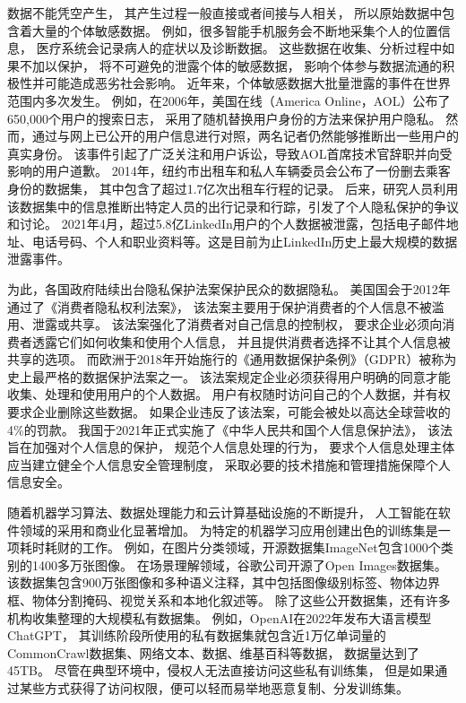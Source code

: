 数据不能凭空产生，
其产生过程一般直接或者间接与人相关，
所以原始数据中包含着大量的个体敏感数据。
例如，很多智能手机服务会不断地采集个人的位置信息，
医疗系统会记录病人的症状以及诊断数据。
这些数据在收集、分析过程中如果不加以保护，
将不可避免的泄露个体的敏感数据，
影响个体参与数据流通的积极性并可能造成恶劣社会影响。
近年来，个体敏感数据大批量泄露的事件在世界范围内多次发生。
例如，在2006年，美国在线（America Online，AOL）公布了650,000个用户的搜索日志，
采用了随机替换用户身份的方法来保护用户隐私。
然而，通过与网上已公开的用户信息进行对照，两名记者仍然能够推断出一些用户的真实身份。
该事件引起了广泛关注和用户诉讼，导致AOL首席技术官辞职并向受影响的用户道歉。
2014年，纽约市出租车和私人车辆委员会公布了一份删去乘客身份的数据集，
其中包含了超过1.7亿次出租车行程的记录。
后来，研究人员利用该数据集中的信息推断出特定人员的出行记录和行踪，引发了个人隐私保护的争议和讨论。
2021年4月，超过5.8亿LinkedIn用户的个人数据被泄露，包括电子邮件地址、电话号码、个人和职业资料等。这是目前为止LinkedIn历史上最大规模的数据泄露事件。

为此，各国政府陆续出台隐私保护法案保护民众的数据隐私。
美国国会于2012年通过了《消费者隐私权利法案》，
该法案主要用于保护消费者的个人信息不被滥用、泄露或共享。
该法案强化了消费者对自己信息的控制权，
要求企业必须向消费者透露它们如何收集和使用个人信息，
并且提供消费者选择不让其个人信息被共享的选项。
而欧洲于2018年开始施行的《通用数据保护条例》（GDPR）被称为史上最严格的数据保护法案之一。
该法案规定企业必须获得用户明确的同意才能收集、处理和使用用户的个人数据。
用户有权随时访问自己的个人数据，并有权要求企业删除这些数据。
如果企业违反了该法案，可能会被处以高达全球营收的4\%的罚款。
我国于2021年正式实施了《中华人民共和国个人信息保护法》，
该法旨在加强对个人信息的保护，
规范个人信息处理的行为，
要求个人信息处理主体应当建立健全个人信息安全管理制度，
采取必要的技术措施和管理措施保障个人信息安全。

随着机器学习算法、数据处理能力和云计算基础设施的不断提升，
人工智能在软件领域的采用和商业化显著增加\cite{Gartner2022}。
为特定的机器学习应用创建出色的训练集是一项耗时耗财的工作。
例如，在图片分类领域，开源数据集ImageNet包含1000个类别的1400多万张图像\cite{}。
在场景理解领域，谷歌公司开源了Open Images数据集。
该数据集包含900万张图像和多种语义注释，其中包括图像级别标签、物体边界框、物体分割掩码、视觉关系和本地化叙述等。
除了这些公开数据集，还有许多机构收集整理的大规模私有数据集。
例如，OpenAI在2022年发布大语言模型ChatGPT，
其训练阶段所使用的私有数据集就包含近1万亿单词量的CommonCrawl数据集、网络文本、数据、维基百科等数据，
数据量达到了45TB\cite{DBLP:conf/nips/BrownMRSKDNSSAA20}。
尽管在典型环境中，侵权人无法直接访问这些私有训练集，
但是如果通过某些方式获得了访问权限，便可以轻而易举地恶意复制、分发训练集。


